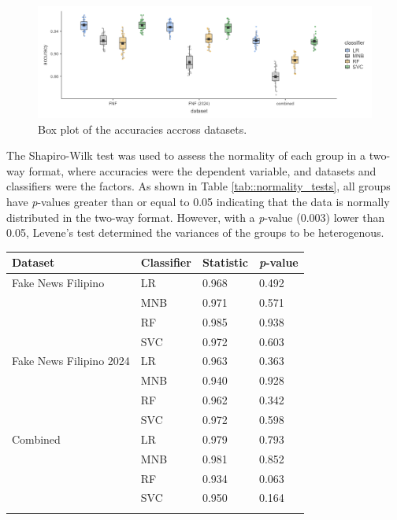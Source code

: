 \begin{figure}[h!]
    \centering
    \includegraphics[width=\textwidth,height=\textheight, keepaspectratio]{figures/stats/box_plot.png}
        \caption{Box plot of the accuracies accross datasets.}
        \label{fig:box_plot_accuracy}
\end{figure}

The Shapiro-Wilk test was used to assess the normality of each group in a two-way format, where accuracies were the dependent variable, and datasets and classifiers were the factors. As shown in Table \ref{tab::normality_tests}, all groups have \textit{p}-values greater than or equal to 0.05 indicating that the data is normally distributed in the two-way format. However, with a \textit{p}-value (0.003) lower than 0.05, Levene's test determined the variances of the groups to be heterogenous.

\pagebreak

\begin{tabularx}{\textwidth}{|l|l|l|l|}
    \hline
    Dataset & Classifier & Statistic & \textit{p}-value \\
    \hline
    Fake News Filipino & LR & 0.968 & 0.492 \\
    & MNB & 0.971 & 0.571 \\
    & RF & 0.985 & 0.938 \\
    & SVC & 0.972 & 0.603 \\
    \hline
    Fake News Filipino 2024 & LR & 0.963 & 0.363 \\
    & MNB & 0.940 & 0.928 \\
    & RF & 0.962 & 0.342 \\
    & SVC & 0.972 & 0.598 \\
    \hline
    Combined & LR & 0.979 & 0.793 \\
    & MNB & 0.981 & 0.852 \\
    & RF & 0.934 & 0.063 \\
    & SVC & 0.950 & 0.164 \\
    \hline
\caption{Shapiro-Wilk normality test in a two-way format.}
\label{tab::normality_tests}
\end{tabularx}

